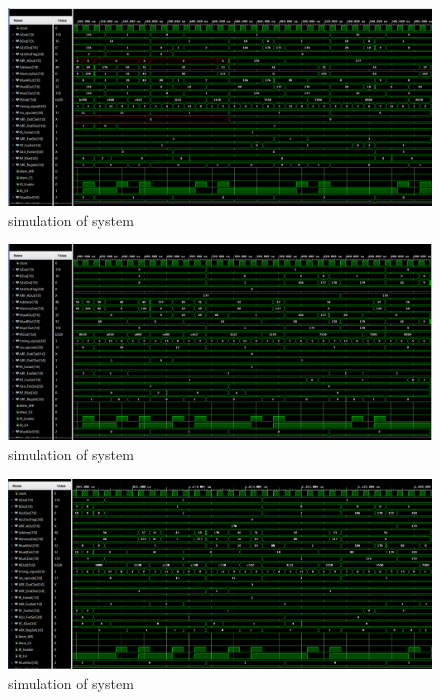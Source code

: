 \documentclass[pdftex,12pt,a4paper]{article}
\begin{document}
\begin{figure}[H]
    \centering
    \includegraphics[width=1\textwidth]{photos/system_result_2.png}	
    \caption{simulation of system}
    \label{implementation}
\end{figure}


\begin{figure}[H]
    \centering
    \includegraphics[width=1\textwidth]{photos/system_result_3.png}	
    \caption{simulation of system}
    \label{implementation}
\end{figure}



\begin{figure}[H]
    \centering
    \includegraphics[width=1\textwidth]{photos/system_result_4.png}	
    \caption{simulation of system}
    \label{implementation}
\end{figure}
\end{document}
